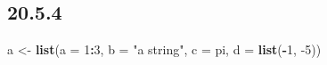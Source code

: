\documentclass[]{book}
\newenvironment{Shaded}{\begin{snugshade}}{\end{snugshade}}
\newcommand{\DataTypeTok}[1]{\textcolor[rgb]{0.13,0.29,0.53}{#1}}
\newcommand{\DecValTok}[1]{\textcolor[rgb]{0.00,0.00,0.81}{#1}}
\newcommand{\KeywordTok}[1]{\textcolor[rgb]{0.13,0.29,0.53}{\textbf{#1}}}
\newcommand{\NormalTok}[1]{#1}
\newcommand{\OperatorTok}[1]{\textcolor[rgb]{0.81,0.36,0.00}{\textbf{#1}}}
\newcommand{\StringTok}[1]{\textcolor[rgb]{0.31,0.60,0.02}{#1}}
\theoremstyle{definition}
\theoremstyle{definition}
\theoremstyle{definition}
\theoremstyle{remark}
\begin{document}
\hypertarget{section-70}{%
\subsection{20.5.4}\label{section-70}}

\begin{Shaded}
\begin{Highlighting}[]
\NormalTok{a <-}\StringTok{ }\KeywordTok{list}\NormalTok{(}\DataTypeTok{a =} \DecValTok{1}\OperatorTok{:}\DecValTok{3}\NormalTok{, }\DataTypeTok{b =} \StringTok{"a string"}\NormalTok{, }\DataTypeTok{c =}\NormalTok{ pi, }\DataTypeTok{d =} \KeywordTok{list}\NormalTok{(}\OperatorTok{-}\DecValTok{1}\NormalTok{, }\DecValTok{-5}\NormalTok{))}
\end{Highlighting}
\end{Shaded}
\end{document}
